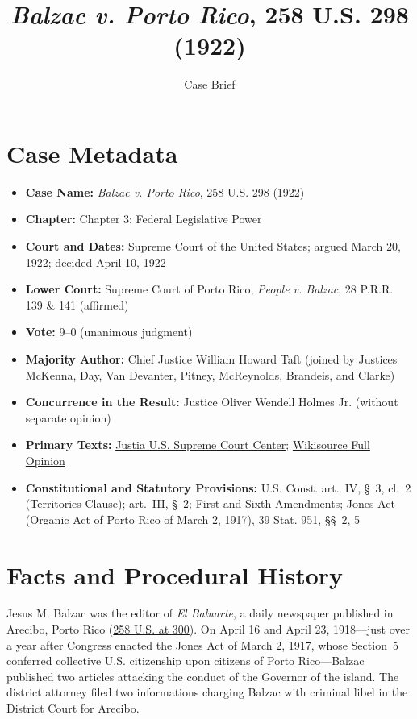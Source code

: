 \documentclass[12pt]{article}
\title{\textit{Balzac v. Porto Rico}, 258 U.S. 298 (1922)}
\author{Case Brief}
\date{}
\begin{document}
\maketitle

\section{Case Metadata}
\begin{itemize}
  \item \textbf{Case Name:} \textit{Balzac v. Porto Rico}, 258 U.S. 298 (1922)
  \item \textbf{Chapter:} Chapter 3: Federal Legislative Power
  \item \textbf{Court and Dates:} Supreme Court of the United States; argued March 20, 1922; decided April 10, 1922
  \item \textbf{Lower Court:} Supreme Court of Porto Rico, \textit{People v. Balzac}, 28 P.R.R. 139 \& 141 (affirmed)
  \item \textbf{Vote:} 9--0 (unanimous judgment)
  \item \textbf{Majority Author:} Chief Justice William Howard Taft (joined by Justices McKenna, Day, Van Devanter, Pitney, McReynolds, Brandeis, and Clarke)
  \item \textbf{Concurrence in the Result:} Justice Oliver Wendell Holmes Jr. (without separate opinion)
  \item \textbf{Primary Texts:} \href{https://supreme.justia.com/cases/federal/us/258/298/}{Justia U.S. Supreme Court Center}; \href{https://en.wikisource.org/wiki/Balzac_v._Porto_Rico/Opinion_of_the_Court}{Wikisource Full Opinion}
  \item \textbf{Constitutional and Statutory Provisions:} U.S. Const. art.~IV, \S~3, cl.~2 (\href{https://www.law.cornell.edu/constitution-conan/article-4/section-3/clause-2/property-clause}{Territories Clause}); art.~III, \S~2; First and Sixth Amendments; Jones Act (Organic Act of Porto Rico of March 2, 1917), 39 Stat. 951, \S\S~2, 5
\end{itemize}

\section{Facts and Procedural History}
Jesus M. Balzac was the editor of \textit{El Baluarte}, a daily newspaper published in Arecibo, Porto Rico (\href{https://supreme.justia.com/cases/federal/us/258/298/}{258 U.S. at 300}). On April 16 and April 23, 1918---just over a year after Congress enacted the Jones Act of March 2, 1917, whose Section~5 conferred collective U.S. citizenship upon citizens of Porto Rico---Balzac published two articles attacking the conduct of the Governor of the island. The district attorney filed two informations charging Balzac with criminal libel in the District Court for Arecibo.
\end{document}
